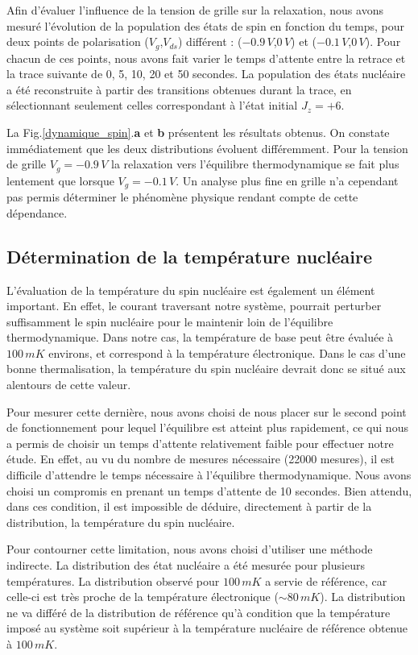 Afin d'évaluer l'influence de la tension de grille sur la relaxation, nous avons mesuré l'évolution de la population des états de spin en fonction du temps, pour deux points de polarisation ($V_g$,$V_{ds}$) différent : ($-0.9\, V$,$0\, V$) et ($-0.1\, V$,$0\, V$). Pour chacun de ces points, nous avons fait varier le temps d'attente entre la retrace et la trace suivante de 0, 5, 10, 20 et 50 secondes. La population des états nucléaire a été reconstruite à partir des transitions obtenues durant la trace, en sélectionnant seulement celles correspondant à l'état initial $J_z=+6$.

La Fig.\ref{dynamique_spin}.\textbf{a} et \textbf{b} présentent les résultats obtenus. On constate immédiatement que les deux distributions évoluent différemment. Pour la tension de grille $V_g = -0.9\,V$ la relaxation vers l'équilibre thermodynamique se fait plus lentement que lorsque $V_g = -0.1\,V$. Un analyse plus fine en grille n'a cependant pas permis déterminer le phénomène physique rendant compte de cette dépendance.

\subsection{Détermination de la température nucléaire}
L'évaluation de la température du spin nucléaire est également un élément important. En effet, le courant traversant notre système, pourrait perturber suffisamment le spin nucléaire pour le maintenir loin de l'équilibre thermodynamique. Dans notre cas, la température de base peut \^etre évaluée à $100\,mK$ environs, et correspond à la température électronique. Dans le cas d'une bonne thermalisation, la température du spin nucléaire devrait donc se situé aux alentours de cette valeur.

Pour mesurer cette dernière, nous avons choisi de nous placer sur le second point de fonctionnement pour lequel l'équilibre est atteint plus rapidement, ce qui nous  a permis de choisir un temps d'attente relativement faible pour effectuer notre étude. En effet, au vu du nombre de mesures nécessaire (22000 mesures), il est difficile d'attendre le temps nécessaire à l'équilibre thermodynamique. Nous avons choisi un compromis en prenant un temps d'attente de 10 secondes. Bien attendu, dans ces condition, il est impossible de déduire, directement à partir de la distribution, la température du spin nucléaire.

Pour contourner cette limitation, nous avons choisi d'utiliser une méthode indirecte. La distribution des état nucléaire a été mesurée pour plusieurs températures. La distribution observé pour $100\,mK$ a servie de référence, car celle-ci est très proche de la température électronique ($\sim 80\,mK$). La distribution ne va différé de la distribution de référence qu'à condition que la température imposé au système soit supérieur à la température nucléaire de référence obtenue à $100\,mK$.

